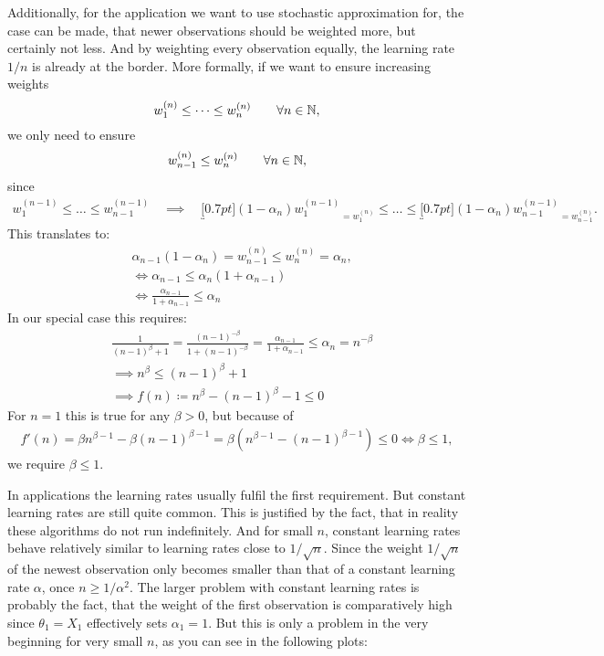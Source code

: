 Additionally, for the application we want to use stochastic approximation for, the case can be made, that newer observations should be weighted more, but certainly not less. And by weighting every observation equally, the learning rate \(1/n\) is already at the border. More formally, if we want to ensure increasing weights
\[
    w_1^{(n)} \le \dots \le w_n^{(n)}  \qquad \forall n\in\mathbb{N},
\]
we only need to ensure
\[
    w_{n-1}^{(n)} \le w_n^{(n)} \qquad \forall n\in\mathbb{N},
\]
since
\begin{align*}
    w_1^{(n-1)} \le \dots \le w_{n-1}^{(n-1)}
    \quad \implies\quad
    \underbracket[0.7pt]{(1-\alpha_n) w_1^{(n-1)}}_{=w_1^{(n)}} 
    \le \dots \le 
    \underbracket[0.7pt]{(1-\alpha_n) w_{n-1}^{(n-1)}}_{=w_{n-1}^{(n)}}.
\end{align*}
This translates to:
\begin{align*}
    &\alpha_{n-1}(1-\alpha_n) = w_{n-1}^{(n)} \le w_n^{(n)} = \alpha_n,\\
    &\iff \alpha_{n-1}\le \alpha_n(1+\alpha_{n-1})\\
    &\iff \frac{\alpha_{n-1}}{1+\alpha_{n-1}}\le \alpha_n
\end{align*}
In our special case this requires:
\begin{align*}
    &\frac{1}{(n-1)^\beta+1}=\frac{(n-1)^{-\beta}}{1+(n-1)^{-\beta}}= \frac{\alpha_{n-1}}{1+\alpha_{n-1}}\le \alpha_n= n^{-\beta}\\
    &\implies n^\beta \le (n-1)^\beta +1\\
    &\implies f(n)\coloneqq n^\beta -(n-1)^\beta -1\le 0
\end{align*}
For \(n=1\) this is true for any \(\beta>0\), but because of
\begin{align*}
    f'(n)= \beta n^{\beta-1} -\beta(n-1)^{\beta-1}=\beta(n^{\beta-1}-(n-1)^{\beta-1})\le 0 \iff \beta\le 1,
\end{align*}
we require \(\beta\le 1\).

In applications the learning rates usually fulfil the first requirement. But constant learning rates are still quite common. This is justified by the fact, that in reality these algorithms do not run indefinitely. And for small \(n\), constant learning rates behave relatively similar to learning rates close to \(1/\sqrt{n}\). Since the weight \(1/\sqrt{n}\) of the newest observation only becomes smaller than that of a constant learning rate \(\alpha\), once \(n\ge1/\alpha^2 \). The larger problem with constant learning rates is probably the fact, that the weight of the first observation is comparatively high since \(\theta_1=X_1\) effectively sets \(\alpha_1=1\). But this is only a problem in the very beginning for very small \(n\), as you can see in the following plots:

